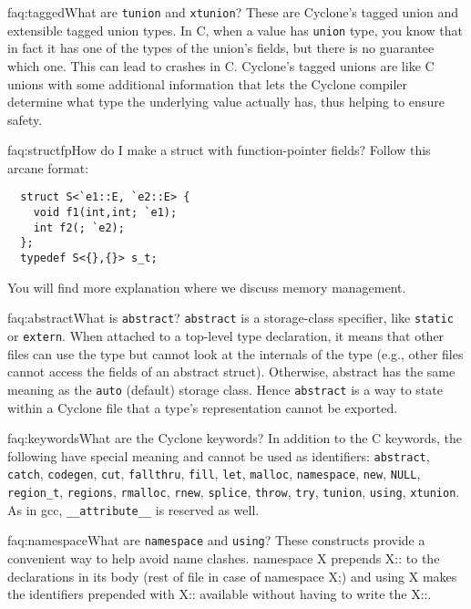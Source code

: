 \begin{faqa}{faq:tagged}{What are \texttt{tunion} and \texttt{xtunion}?}
These are Cyclone's tagged union and extensible tagged union types.
In C, when a value has \texttt{union} type, you know that in fact it
has one of the types of the union's fields, but there is no guarantee
which one.  This can lead to crashes in C\@.  Cyclone's tagged unions
are like C unions with some additional information that lets the
Cyclone compiler determine what type the underlying value actually
has, thus helping to ensure safety.
\end{faqa}

\begin{faqa}{faq:structfp}{How do I make a struct with function-pointer fields?}
Follow this arcane format:
\begin{verbatim}
  struct S<`e1::E, `e2::E> {
    void f1(int,int; `e1);
    int f2(; `e2);
  };
  typedef S<{},{}> s_t;
\end{verbatim}
You will find more explanation where we discuss memory management.
\end{faqa}

\begin{faqa}{faq:abstract}{What is \texttt{abstract}?}
\texttt{abstract} is a storage-class specifier, like \texttt{static}
or \texttt{extern}.  When attached to a top-level type declaration, it
means that other files can use the type but cannot look at the
internals of the type (e.g., other files cannot access the fields of
an abstract struct).  Otherwise, abstract has the same meaning as the
\texttt{auto} (default) storage class.  Hence \texttt{abstract} is a
way to state within a Cyclone file that a type's representation cannot
be exported.
\end{faqa}

\begin{faqa}{faq:keywords}{What are the Cyclone keywords?}
In addition to the C keywords, the following have special meaning and
cannot be used as identifiers: \texttt{abstract}, \texttt{catch},
\texttt{codegen}, \texttt{cut}, \texttt{fallthru}, \texttt{fill},
\texttt{let}, \texttt{malloc},
\texttt{namespace}, \texttt{new}, \texttt{NULL},
\texttt{region_t}, \texttt{regions},
\texttt{rmalloc}, \texttt{rnew}, \texttt{splice},
\texttt{throw}, \texttt{try}, \texttt{tunion}, \texttt{using},
\texttt{xtunion}.  As in gcc,
\texttt{__attribute__} is reserved as well.
\end{faqa}

\begin{faqa}{faq:namespace}{What are \texttt{namespace} and \texttt{using}?}
These constructs provide a convenient way to help avoid name clashes.
namespace X prepends X:: to the declarations in its body (rest of file
in case of namespace X;) and using X makes the identifiers prepended
with X:: available without having to write the X::.
\end{faqa}

